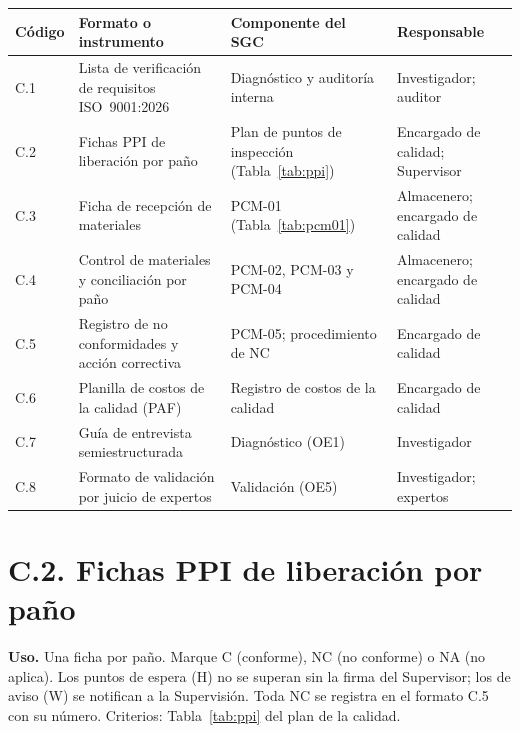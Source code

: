 \begin{center}
\footnotesize{}\renewcommand{\arraystretch}{1.25}
\begin{tabularx}{\linewidth}{@{}P{1.0cm}LP{4.6cm}P{3.0cm}@{}}
\toprule
\textbf{Código} & \textbf{Formato o instrumento} & \textbf{Componente del SGC} & \textbf{Responsable} \\
\midrule
C.1 & Lista de verificación de requisitos ISO~9001:2026 & Diagnóstico y auditoría interna & Investigador; auditor \\
C.2 & Fichas PPI de liberación por paño & Plan de puntos de inspección (Tabla~\ref{tab:ppi}) & Encargado de calidad; Supervisor \\
C.3 & Ficha de recepción de materiales & PCM-01 (Tabla~\ref{tab:pcm01}) & Almacenero; encargado de calidad \\
C.4 & Control de materiales y conciliación por paño & PCM-02, PCM-03 y PCM-04 & Almacenero; encargado de calidad \\
C.5 & Registro de no conformidades y acción correctiva & PCM-05; procedimiento de NC & Encargado de calidad \\
C.6 & Planilla de costos de la calidad (PAF) & Registro de costos de la calidad & Encargado de calidad \\
C.7 & Guía de entrevista semiestructurada & Diagnóstico (OE1) & Investigador \\
C.8 & Formato de validación por juicio de expertos & Validación (OE5) & Investigador; expertos \\
\bottomrule
\end{tabularx}
\end{center}


\clearpage
\section*{C.2. Fichas PPI de liberación por paño}

{\small
\textbf{Uso.} Una ficha por paño. Marque C (conforme), NC (no conforme) o NA (no aplica). Los puntos de espera (H) no se superan sin la firma del Supervisor; los de aviso (W) se notifican a la Supervisión. Toda NC se registra en el formato C.5 con su número. Criterios: Tabla~\ref{tab:ppi} del plan de la calidad.\par}

